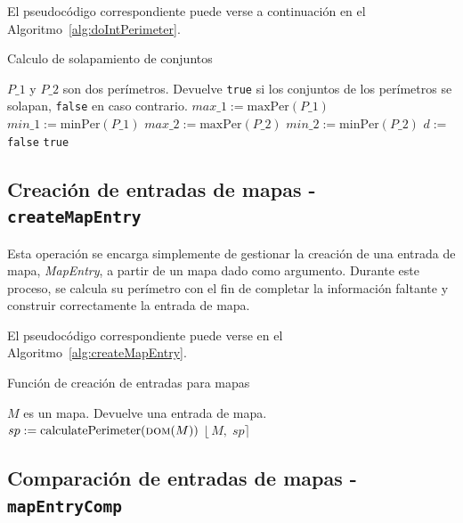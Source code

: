El pseudocódigo correspondiente puede verse a continuación en el Algoritmo~\ref{alg:doIntPerimeter}.


\begin{algorithm}
\caption{Calculo de solapamiento de conjuntos}
\label{alg:doIntPerimeter}
\begin{algorithmic}[1]
\Require $P\_1$ y $P\_2$ son dos perímetros.
\Ensure Devuelve \texttt{true} si los conjuntos de los perímetros se solapan, \texttt{false} en caso contrario.
    \State $max\_1 := \mathrm{maxPer}(P\_1)$
    \State $min\_1 := \mathrm{minPer}(P\_1)$
    \State $max\_2 := \mathrm{maxPer}(P\_2)$
    \State $min\_2 := \mathrm{minPer}(P\_2)$
    \State $d :=$ 
            \State \Return \texttt{false} 
        \EndIf
    \EndFor
    \State \Return \texttt{true}  
\EndFunction
\end{algorithmic}
\end{algorithm}


\subsection{Creación de entradas de mapas - \texttt{createMapEntry}}

Esta operación se encarga simplemente de gestionar la creación de una entrada de mapa, \textit{MapEntry}, a partir de un mapa dado como argumento. Durante este proceso, se calcula su perímetro con el fin de completar la información faltante y construir correctamente la entrada de mapa.

El pseudocódigo correspondiente puede verse en el Algoritmo~\ref{alg:createMapEntry}.


\begin{algorithm}
\caption{Función de creación de entradas para mapas}
\label{alg:createMapEntry}
\begin{algorithmic}[1]
\Require $M$ es un mapa.
\Ensure Devuelve una entrada de mapa.
    \State $sp :=  \mathrm{calculatePerimeter}(\Call{dom}{M})$
    \State \Return $\lfloor\,M,\;sp\rceil$ 
\EndFunction
\end{algorithmic}
\end{algorithm}

\subsection{Comparación de entradas de mapas - \texttt{mapEntryComp}}

